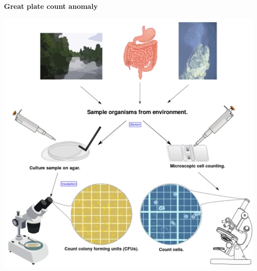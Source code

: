 \documentclass[10pt]{beamer}
\begin{document}
\begin{frame}
	\begin{columns}
		
		\begin{column}{0.5\textwidth}
			\vspace{-2mm}
			\begin{center}
				\Large\textbf{Great plate count anomaly}	
			\end{center}
			\begin{center}			
			\includegraphics[width=\textwidth]{./images/Great-plate-count-anomaly}
			\end{center}
		\end{column}
		

\end{columns}
\end{frame}
\end{document}

